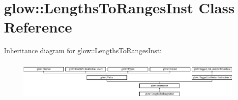 \hypertarget{classglow_1_1_lengths_to_ranges_inst}{}\section{glow\+:\+:Lengths\+To\+Ranges\+Inst Class Reference}
\label{classglow_1_1_lengths_to_ranges_inst}
Inheritance diagram for glow\+:\+:Lengths\+To\+Ranges\+Inst\+:\begin{figure}[H]
\begin{center}
\leavevmode
\includegraphics[height=1.991111cm]{classglow_1_1_lengths_to_ranges_inst}
\end{center}
\end{figure}
